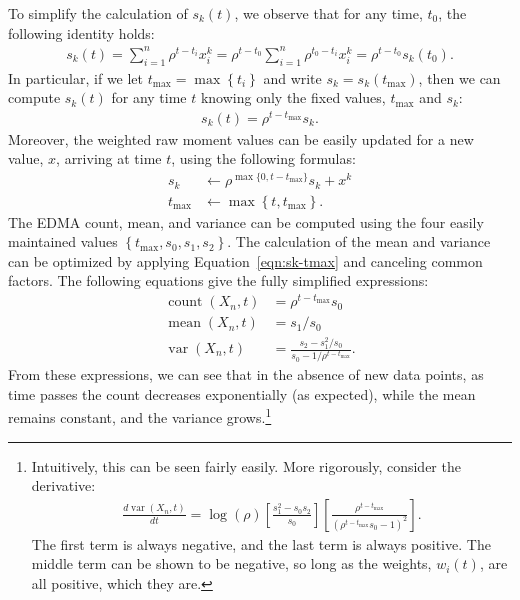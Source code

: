 \documentclass{article}
\DeclareMathOperator{\cnt}{count}
\DeclareMathOperator{\mean}{mean}
\DeclareMathOperator{\var}{var}
\newcommand{\tmax}{{t_\text{max}}}
\begin{document}
To simplify the calculation of $s_k(t)$, we observe that for any time, $t_0$, the following identity holds:
\begin{align}
s_k(t)
= \sum_{i=1}^{n}{\rho^{t-t_i} x_i^k}
= \rho^{t-t_0} \sum_{i=1}^{n}{\rho^{t_0-t_i} x_i^k} 
= \rho^{t-t_0} s_k(t_0).
\end{align}
In particular, if we let $\tmax=\max\left\{t_i\right\}$ and write $s_k=s_k(\tmax)$, then we can compute $s_k(t)$ for any time $t$ knowing only the fixed values, $\tmax$ and $s_k$:
\begin{align}
\label{eqn:sk-tmax}
s_k(t) = \rho^{t-\tmax} s_k.
\end{align}
Moreover, the weighted raw moment values can be easily updated for a new value, $x$, arriving at time $t$, using the following formulas:
\begin{align}
s_k &\leftarrow \rho^{\max\{0,t-\tmax\}} s_k + x^k \\
\tmax &\leftarrow \max\left\{t,\tmax\right\}.
\end{align}
The EDMA count, mean, and variance can be computed using the four easily maintained values $\left\{\tmax,s_0,s_1,s_2\right\}$. The calculation of the mean and variance can be optimized by applying Equation~\ref{eqn:sk-tmax} and canceling common factors. The following equations give the fully simplified expressions:
\begin{align}
\cnt(X_n,t) &= \rho^{t-\tmax} s_0 \\
\mean(X_n,t) &= s_1/s_0 \\
\var(X_n,t) &= \frac{s_2 - s_1^2/s_0}{s_0-1/\rho^{t-\tmax}}.
\end{align}
From these expressions, we can see that in the absence of new data points, as time passes the count decreases exponentially (as expected), while the mean remains constant, and the variance grows.\footnote{Intuitively, this can be seen fairly easily. More rigorously, consider the derivative:
\begin{align}
\frac{d \var(X_n,t)}{d t} =
	\log(\rho)
	\left[ \frac{s_1^2 - s_0 s_2}{s_0} \right]
	\left[ \frac{\rho^{t-\tmax}}{(\rho^{t-\tmax} s_0 - 1)^2} \right].
\end{align}
The first term is always negative, and the last term is always positive. The middle term can be shown to be negative, so long as the weights, $w_i(t)$, are all positive, which they are.
}
\end{document}

